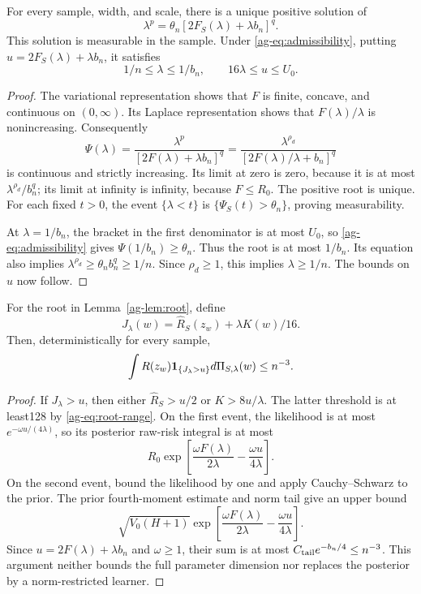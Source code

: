 \begin{lemma}
\label{ag-lem:root}
For every sample, width, and scale, there is a unique positive solution of
\begin{equation}
 \lambda^p=\theta_n[2F_S(\lambda)+\lambda b_n]^q.
 \label{ag-eq:root}
\end{equation}
This solution is measurable in the sample. Under \eqref{ag-eq:admissibility}, putting $u=2F_S(\lambda)+\lambda b_n$, it satisfies
\begin{equation}
 1/n\le\lambda\le1/b_n,\qquad 16\lambda\le u\le U_0.
 \label{ag-eq:root-range}
\end{equation}
\end{lemma}
\begin{proof}
The variational representation shows that $F$ is finite, concave, and continuous on $(0,\infty)$. Its Laplace representation shows that $F(\lambda)/\lambda$ is nonincreasing. Consequently
\[
 \Psi(\lambda)=\frac{\lambda^p}{[2F(\lambda)+\lambda b_n]^q}
 =\frac{\lambda^{\rho_d}}{[2F(\lambda)/\lambda+b_n]^q}
\]
is continuous and strictly increasing. Its limit at zero is zero, because it is at most $\lambda^{\rho_d}/b_n^q$; its limit at infinity is infinity, because $F\le R_0$. The positive root is unique. For each fixed $t>0$, the event $\{\lambda<t\}$ is $\{\Psi_S(t)>\theta_n\}$, proving measurability.

At $\lambda=1/b_n$, the bracket in the first denominator is at most $U_0$, so \eqref{ag-eq:admissibility} gives $\Psi(1/b_n)\ge\theta_n$. Thus the root is at most $1/b_n$. Its equation also implies $\lambda^{\rho_d}\ge\theta_n b_n^q\ge1/n$. Since $\rho_d\ge1$, this implies $\lambda\ge1/n$. The bounds on $u$ now follow.
\end{proof}

\begin{lemma}
\label{ag-lem:joint-tail}
For the root in Lemma~\ref{ag-lem:root}, define
\[
 J_\lambda(w)=\widehat R_S(z_w)+\lambda K(w)/16.
\]
Then, deterministically for every sample,
\begin{equation}
 \int R(z_w)\mathbf1_{\{J_\lambda>u\}}d\Pi_{S,\lambda}(w)\le n^{-3}.
 \label{ag-eq:joint-tail}
\end{equation}
\end{lemma}
\begin{proof}
If $J_\lambda>u$, then either $\widehat R_S>u/2$ or $K>8u/\lambda$. The latter threshold is at least128 by \eqref{ag-eq:root-range}. On the first event, the likelihood is at most $e^{-\omega u/(4\lambda)}$, so its posterior raw-risk integral is at most
\[
 R_0\exp\left[\frac{\omega F(\lambda)}{2\lambda}
                      -\frac{\omega u}{4\lambda}\right].
\]
On the second event, bound the likelihood by one and apply Cauchy--Schwarz to the prior. The prior fourth-moment estimate and norm tail give an upper bound
\[
 \sqrt{V_0(H+1)}\exp\left[\frac{\omega F(\lambda)}{2\lambda}
                      -\frac{\omega u}{4\lambda}\right].
\]
Since $u=2F(\lambda)+\lambda b_n$ and $\omega\ge1$, their sum is at most $C_{\rm tail}e^{-b_n/4}\le n^{-3}$. This argument neither bounds the full parameter dimension nor replaces the posterior by a norm-restricted learner.
\end{proof}

